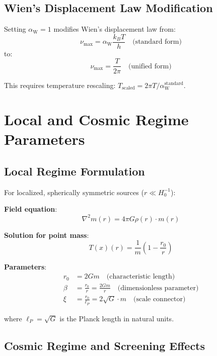 \documentclass[12pt,a4paper]{article}
\newcommand{\Tfield}{T(x)}
\newcommand{\alphaW}{\alpha_{\text{W}}}
\begin{document}
	\subsection{Wien's Displacement Law Modification}
	\label{subsec:wien_modification}
	
	Setting $\alphaW = 1$ modifies Wien's displacement law from:
	\begin{equation}
		\nu_{\max} = \alphaW \frac{k_B T}{h} \quad \text{(standard form)}
	\end{equation}
	to:
	\begin{equation}
		\nu_{\max} = \frac{T}{2\pi} \quad \text{(unified form)}
	\end{equation}
	
	This requires temperature rescaling: $T_{\text{scaled}} = 2\pi T / \alphaW^{\text{standard}}$.
	
	\section{Local and Cosmic Regime Parameters}
	\label{sec:regime_parameters}
	
	\subsection{Local Regime Formulation}
	\label{subsec:local_regime}
	
	For localized, spherically symmetric sources ($r \ll H_0^{-1}$):
	
	\textbf{Field equation}:
	\begin{equation}
		\nabla^2 m(r) = 4\pi G \rho(r) \cdot m(r)
	\end{equation}
	
	\textbf{Solution for point mass}:
	\begin{equation}
		\Tfield(r) = \frac{1}{m}\left(1 - \frac{r_0}{r}\right)
	\end{equation}
	
	\textbf{Parameters}:
	\begin{align}
		r_0 &= 2Gm \quad \text{(characteristic length)} \\
		\beta &= \frac{r_0}{r} = \frac{2Gm}{r} \quad \text{(dimensionless parameter)} \\
		\xi &= \frac{r_0}{\ell_P} = 2\sqrt{G} \cdot m \quad \text{(scale connector)}
	\end{align}
	
	where $\ell_P = \sqrt{G}$ is the Planck length in natural units.
	
	\subsection{Cosmic Regime and Screening Effects}
	\label{subsec:cosmic_regime}
	
\end{document}
